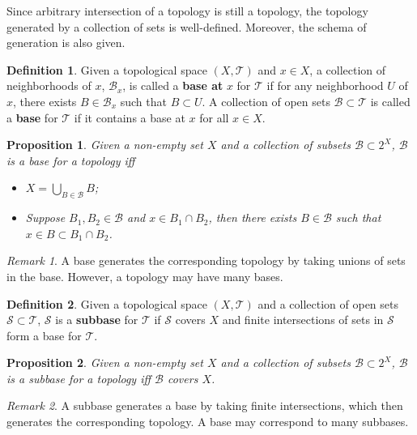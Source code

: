\documentclass[openany]{book}
\newtheorem{proposition}{Proposition}[chapter]
\theoremstyle{definition}
\newtheorem{definition}{Definition}[chapter]
\theoremstyle{remark}
\newtheorem*{remark}{Remark}
\begin{document}
Since arbitrary intersection of a topology is still a topology, the topology generated by a collection of sets is well-defined. Moreover, the schema of generation is also given.
\begin{definition}
    Given a topological space $(X,\mathcal{T})$ and $x\in X$, a collection of neighborhoods of $x$, $\mathcal{B}_x$, is called a \textbf{base at} $x$ for $\mathcal{T}$ if for any neighborhood $U$ of $x$, there exists $B\in \mathcal{B}_x$ such that $B\subset U$. A collection of open sets $\mathcal{B}\subset \mathcal{T}$ is called a \textbf{base} for $\mathcal{T}$ if it contains a base at $x$ for all $x\in X$.
\end{definition}
\begin{proposition}
    Given a non-empty set $X$ and a collection of subsets $\mathcal{B}\subset2^X$, $\mathcal{B}$ is a base for a topology iff
    \begin{itemize}
        \item $X=\bigcup_{B\in \mathcal{B}}B$;
        \item Suppose $B_1,B_2\in \mathcal{B}$ and $x\in B_1\cap B_2$, then there exists $B\in \mathcal{B}$ such that $x\in B\subset B_1\cap B_2$.
    \end{itemize}
\end{proposition}
\begin{remark}
    A base generates the corresponding topology by taking unions of sets in the base. However, a topology may have many bases.
\end{remark}
\begin{definition}
    Given a topological space $(X,\mathcal{T})$ and a collection of open sets $\mathcal{S}\subset \mathcal{T}$, $\mathcal{S}$ is a \textbf{subbase} for $\mathcal{T}$ if $\mathcal{S}$ covers $X$ and finite intersections of sets in $\mathcal{S}$ form a base for $\mathcal{T}$.
\end{definition}
\begin{proposition}
    Given a non-empty set $X$ and a collection of subsets $\mathcal{B}\subset2^X$, $\mathcal{B}$ is a subbase for a topology iff $\mathcal{B}$ covers $X$.
\end{proposition}
\begin{remark}
    A subbase generates a base by taking finite intersections, which then generates the corresponding topology. A base may correspond to many subbases.
\end{remark}
\end{document}
